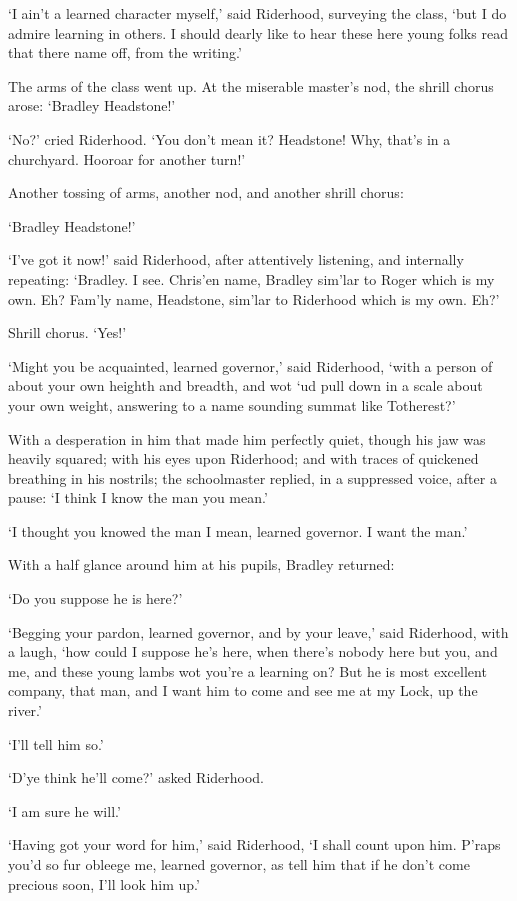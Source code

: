 ‘I ain’t a learned character myself,’ said Riderhood, surveying the
class, ‘but I do admire learning in others. I should dearly like to hear
these here young folks read that there name off, from the writing.’

The arms of the class went up. At the miserable master’s nod, the shrill
chorus arose: ‘Bradley Headstone!’

‘No?’ cried Riderhood. ‘You don’t mean it? Headstone! Why, that’s in a
churchyard. Hooroar for another turn!’

Another tossing of arms, another nod, and another shrill chorus:

‘Bradley Headstone!’

‘I’ve got it now!’ said Riderhood, after attentively listening, and
internally repeating: ‘Bradley. I see. Chris’en name, Bradley sim’lar to
Roger which is my own. Eh? Fam’ly name, Headstone, sim’lar to Riderhood
which is my own. Eh?’

Shrill chorus. ‘Yes!’

‘Might you be acquainted, learned governor,’ said Riderhood, ‘with a
person of about your own heighth and breadth, and wot ‘ud pull down in
a scale about your own weight, answering to a name sounding summat like
Totherest?’

With a desperation in him that made him perfectly quiet, though his jaw
was heavily squared; with his eyes upon Riderhood; and with traces of
quickened breathing in his nostrils; the schoolmaster replied, in a
suppressed voice, after a pause: ‘I think I know the man you mean.’

‘I thought you knowed the man I mean, learned governor. I want the man.’

With a half glance around him at his pupils, Bradley returned:

‘Do you suppose he is here?’

‘Begging your pardon, learned governor, and by your leave,’ said
Riderhood, with a laugh, ‘how could I suppose he’s here, when there’s
nobody here but you, and me, and these young lambs wot you’re a learning
on? But he is most excellent company, that man, and I want him to come
and see me at my Lock, up the river.’

‘I’ll tell him so.’

‘D’ye think he’ll come?’ asked Riderhood.

‘I am sure he will.’

‘Having got your word for him,’ said Riderhood, ‘I shall count upon him.
P’raps you’d so fur obleege me, learned governor, as tell him that if he
don’t come precious soon, I’ll look him up.’

